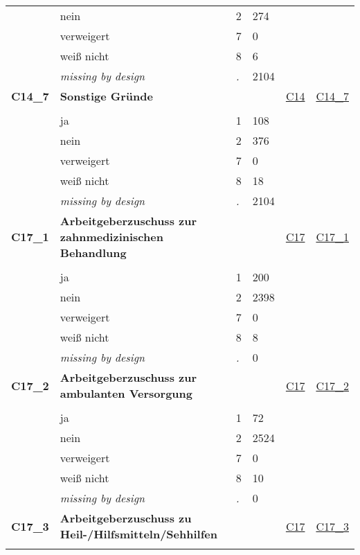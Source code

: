\begin{longtable}{| L{2.45cm} | L{6cm} | C{1.5cm} | R{1cm} | C{2.25cm} | C{2.25cm} |}
   & nein & 2 & 274 &  &  \\ 
   & verweigert & 7 & 0 &  &  \\ 
   & weiß nicht & 8 & 6 &  &  \\ 
   & \textit{missing by design} & \textit{.} & 2104 &  &  \\ 
   \midrule
\textbf{C14\_7}\label{var:C14:7} & \textbf{Sonstige Gründe} &  &  & \hyperref[C14]{C14} & \hyperref[var:suf:C14:7]{C14\_7} \\ 
   &  &  &  &  &  \\ 
   & ja & 1 & 108 &  &  \\ 
   & nein & 2 & 376 &  &  \\ 
   & verweigert & 7 & 0 &  &  \\ 
   & weiß nicht & 8 & 18 &  &  \\ 
   & \textit{missing by design} & \textit{.} & 2104 &  &  \\ 
   \midrule
\textbf{C17\_1}\label{var:C17:1} & \textbf{Arbeitgeberzuschuss zur zahnmedizinischen Behandlung} &  &  & \hyperref[C17]{C17} & \hyperref[var:suf:C17:1]{C17\_1} \\ 
   &  &  &  &  &  \\ 
   & ja & 1 & 200 &  &  \\ 
   & nein & 2 & 2398 &  &  \\ 
   & verweigert & 7 & 0 &  &  \\ 
   & weiß nicht & 8 & 8 &  &  \\ 
   & \textit{missing by design} & \textit{.} & 0 &  &  \\ 
   \midrule
\textbf{C17\_2}\label{var:C17:2} & \textbf{Arbeitgeberzuschuss zur ambulanten Versorgung} &  &  & \hyperref[C17]{C17} & \hyperref[var:suf:C17:2]{C17\_2} \\ 
   &  &  &  &  &  \\ 
   & ja & 1 & 72 &  &  \\ 
   & nein & 2 & 2524 &  &  \\ 
   & verweigert & 7 & 0 &  &  \\ 
   & weiß nicht & 8 & 10 &  &  \\ 
   & \textit{missing by design} & \textit{.} & 0 &  &  \\ 
   \midrule
\textbf{C17\_3}\label{var:C17:3} & \textbf{Arbeitgeberzuschuss zu Heil-/Hilfsmitteln/Sehhilfen} &  &  & \hyperref[C17]{C17} & \hyperref[var:suf:C17:3]{C17\_3} \\ 
   &  &  &  &  &  \\ 

\end{longtable}
